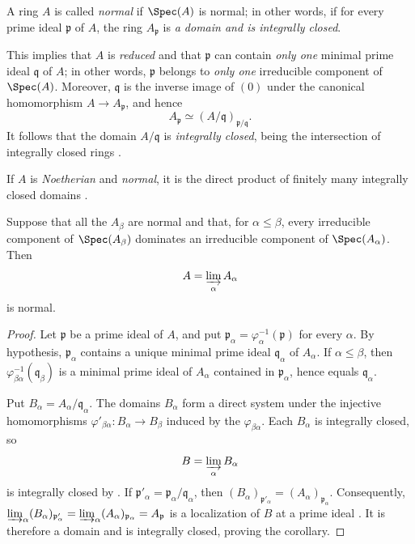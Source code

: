 \begin{env}[5.13.5]
\label{IV.5.13.5}
A ring $A$ is called \emph{normal} if $\Spec(A)$ is normal; in
other words, if for every prime ideal $\mathfrak p$ of $A$, the
ring $A_{\mathfrak p}$ is \emph{a domain and is integrally closed}.

This implies that $A$ is \emph{reduced} and that $\mathfrak p$ can
contain \emph{only one} minimal prime ideal $\mathfrak q$ of $A$; in
other words, $\mathfrak p$ belongs to \emph{only one} irreducible
component of $\Spec(A)$.  Moreover, $\mathfrak q$ is the inverse
image of $(0)$ under the canonical homomorphism
$A\to A_{\mathfrak p}$, and hence
\[
  A_{\mathfrak p}
  \simeq
  (A/\mathfrak q)_{\mathfrak p/\mathfrak q}.
\]
It follows that the domain $A/\mathfrak q$ is \emph{integrally closed},
being the intersection of integrally closed rings
.

If $A$ is \emph{Noetherian} and \emph{normal}, it is the direct product of
finitely many integrally closed domains .
\end{env}

\begin{corollary}[5.13.6]
\label{IV.5.13.6}
Suppose that all the $A_\beta$ are normal and that, for
$\alpha\leq\beta$, every irreducible component of
$\Spec(A_\beta)$ dominates an irreducible component of
$\Spec(A_\alpha)$.  Then
\[
  A=\varinjlim_\alpha A_\alpha
\]
is normal.
\end{corollary}

\begin{proof}
Let $\mathfrak p$ be a prime ideal of $A$, and put $\mathfrak p_\alpha=\varphi_\alpha^{-1}(\mathfrak p)$
for every $\alpha$.  By hypothesis, $\mathfrak p_\alpha$
contains a unique minimal prime ideal $\mathfrak q_\alpha$ of
$A_\alpha$.  If $\alpha\leq\beta$, then
$\varphi_{\beta\alpha}^{-1}(\mathfrak q_\beta)$ is a minimal
prime ideal of $A_\alpha$ contained in $\mathfrak p_\alpha$,
hence equals $\mathfrak q_\alpha$.

Put $B_\alpha=A_\alpha/\mathfrak q_\alpha$.
The domains $B_\alpha$ form a direct system under the injective
homomorphisms $\varphi'_{\beta\alpha}:B_\alpha\longrightarrow B_\beta$
induced by the $\varphi_{\beta\alpha}$.  Each $B_\alpha$ is
integrally closed, so
\[
  B=\varinjlim_\alpha B_\alpha
\]
is integrally closed by .  If $\mathfrak p'_\alpha
=\mathfrak p_\alpha/\mathfrak q_\alpha$,
then $(B_\alpha)_{\mathfrak p'_\alpha}
=(A_\alpha)_{\mathfrak p_\alpha}$.
Consequently, $\varinjlim_\alpha(B_\alpha)_{\mathfrak p'_\alpha}
=
\varinjlim_\alpha(A_\alpha)_{\mathfrak p_\alpha}
=
A_{\mathfrak p}$
is a localization of $B$ at a prime ideal
.  It is therefore a domain and is integrally
closed, proving the corollary.
\end{proof}

